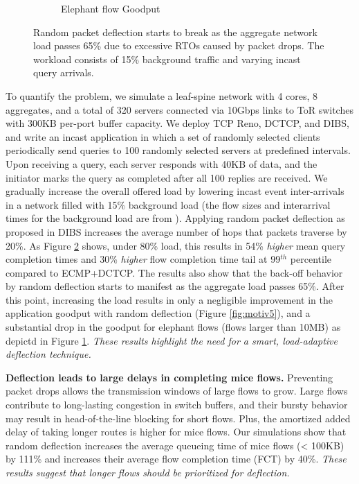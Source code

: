 \begin{figure}[t]
\begin{subfigure}[t]{.32\linewidth}
		\caption{\small{Elephant flow Goodput}}
		\label{fig:motiv8}
	\end{subfigure}
	\caption{\small{Random packet deflection starts to break as the aggregate network load passes 65\% due to excessive RTOs caused by packet drops. The workload consists of 15\% background traffic and varying incast query arrivals.}}
	\label{fig:congestion_collapse}
	\vspace{-2mm}
\end{figure}



To quantify the problem, we simulate a leaf-spine network with 4 cores, 8 aggregates, and a total of 320 servers connected via 10Gbps links to ToR switches with 300KB per-port buffer capacity. We deploy TCP Reno, DCTCP, and DIBS, and write an incast application in which a set of randomly selected clients periodically send queries to 100 randomly selected servers at predefined intervals. Upon receiving a query, each server responds with 40KB of data, and the initiator marks the query as completed after all 100 replies are received. We gradually increase the overall offered load by lowering incast event inter-arrivals in a network filled with 15\% background load (the flow sizes and interarrival times for the background load are from \cite{social}). 
Applying random packet deflection as proposed in DIBS increases the average number of hops that packets traverse by 20\%. As Figure \ref{fig:congestion_collapse} shows, under 80\% load, this results in 54\% \emph{higher} mean query completion times and 30\% \emph{higher} flow completion time tail at 99$^{th}$ percentile compared to ECMP+DCTCP. The results also show that the back-off behavior by random deflection starts to manifest as the aggregate load passes 65\%. After this point, increasing the load results in only a negligible improvement in the application goodput with random deflection (Figure \ref{fig:motiv5}), and a substantial drop in the goodput for elephant flows (flows larger than 10MB) as depictd in Figure \ref{fig:motiv8}.
\emph{These results highlight the need for a smart, load-adaptive deflection technique.}

\textbf{Deflection leads to large delays in completing mice flows.}
Preventing packet drops allows the transmission windows of large flows to grow. Large flows contribute to long-lasting congestion in switch buffers, and their bursty behavior may result in head-of-the-line blocking for short flows. Plus, the amortized added delay of taking longer routes is higher for mice flows.
Our simulations show that random deflection increases the average queueing time of mice flows (< 100KB) by 111\% and increases their average flow completion time (FCT)
by 40\%.
%
\emph{These results suggest that longer flows should be prioritized for deflection.}


